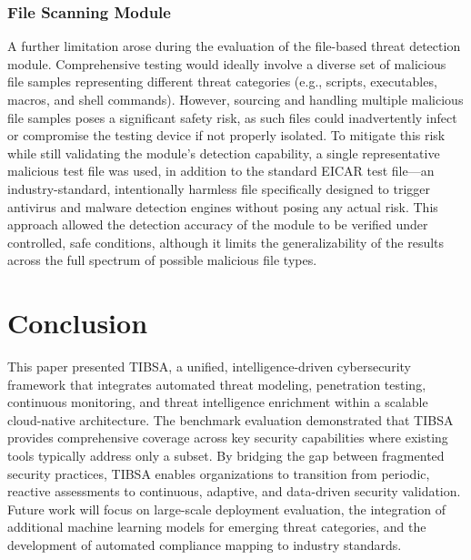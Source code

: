 \documentclass[12pt, a4paper]{article}
\begin{document}
\subsubsection{File Scanning Module}
A further limitation arose during the evaluation of the file-based threat detection module. Comprehensive testing would ideally involve a diverse set of malicious file samples representing different threat categories (e.g., scripts, executables, macros, and shell commands). However, sourcing and handling multiple malicious file samples poses a significant safety risk, as such files could inadvertently infect or compromise the testing device if not properly isolated. To mitigate this risk while still validating the module's detection capability, a single representative malicious test file was used, in addition to the standard EICAR test file---an industry-standard, intentionally harmless file specifically designed to trigger antivirus and malware detection engines without posing any actual risk. This approach allowed the detection accuracy of the module to be verified under controlled, safe conditions, although it limits the generalizability of the results across the full spectrum of possible malicious file types.

\section{Conclusion}

This paper presented TIBSA, a unified, intelligence-driven cybersecurity framework that integrates automated threat modeling, penetration testing, continuous monitoring, and threat intelligence enrichment within a scalable cloud-native architecture. The benchmark evaluation demonstrated that TIBSA provides comprehensive coverage across key security capabilities where existing tools typically address only a subset. By bridging the gap between fragmented security practices, TIBSA enables organizations to transition from periodic, reactive assessments to continuous, adaptive, and data-driven security validation. Future work will focus on large-scale deployment evaluation, the integration of additional machine learning models for emerging threat categories, and the development of automated compliance mapping to industry standards.
\end{document}
